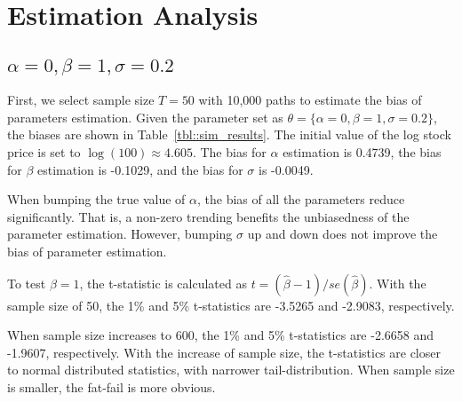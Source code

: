 \documentclass[11pt,reqno,final]{amsart}
\begin{document}
\section{Estimation Analysis}
\subsection{$\alpha=0, \beta=1, \sigma=0.2$}
First, we select sample size $T=50$ with 10,000 paths to estimate the bias of parameters estimation. Given the parameter set as $\theta=\{\alpha=0, \beta=1, \sigma=0.2\}$, the biases are shown in Table~\ref{tbl::sim_results}. The initial value of the log stock price is set to $\log(100)\approx 4.605$. The bias for $\alpha$ estimation is 0.4739, the bias for $\beta$ estimation is -0.1029, and the bias for $\sigma$ is -0.0049. 

When bumping the true value of $\alpha$, the bias of all the parameters reduce significantly. That is, a non-zero trending benefits the unbiasedness of the parameter estimation. However, bumping $\sigma$ up and down does not improve the bias of parameter estimation. 

To test $\beta=1$, the t-statistic is calculated as $t=(\hat{\beta}-1)/se(\hat{\beta})$. With the sample size of 50, the 1\% and 5\% t-statistics are -3.5265 and -2.9083, respectively. 

When sample size increases to 600, the 1\% and 5\% t-statistics are -2.6658 and -1.9607, respectively. With the increase of sample size, the t-statistics are closer to normal distributed statistics, with narrower tail-distribution. When sample size is smaller, the fat-fail is more obvious. 
\end{document}
